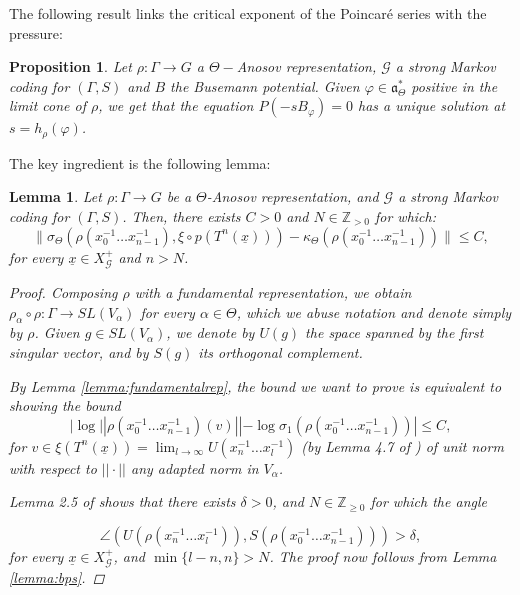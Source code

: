 \documentclass{amsart}
\newtheorem{lemma}[thm]{Lemma}
\newtheorem{prop}[thm]{Proposition}
\theoremstyle{remark}
\theoremstyle{definition}
\begin{document}
The following result links the critical exponent of the Poincar\'{e} series with the pressure:

\begin{prop}
   \label{prop:poincareradioespectral}
 Let $\rho : \Gamma \rightarrow G$ a $\Theta-$Anosov representation, $\mathcal{G}$ a strong Markov coding for $(\Gamma,S)$ and $B$ the Busemann potential. 
 Given $\varphi \in \mathfrak{a}_\Theta^*$ positive in the limit cone of $\rho$, we get that the equation $P(-s B_\varphi)= 0$ has a unique solution at $s = h_\rho (\varphi)$. 
\end{prop}

The key ingredient is the following lemma: 

\begin{lemma}
   \label{lemma:multiconesbusemann}
 Let $\rho: \Gamma \to G$ be a $\Theta$-Anosov representation, and $\mathcal{G}$ a strong Markov coding for $(\Gamma,S)$.
 Then, there exists $C>0$ and $N \in \mathbb{Z}_{>0}$ for which: 
   $$\|\sigma_\Theta(\rho(x_{0}^{-1}\ldots x_{n-1}^{-1}), \xi \circ p (T^n(\underline{x}))) - \kappa_\Theta(\rho(x_0^{-1}\ldots x_{n-1}^{-1}))\| \leq C,$$
 for every $\underline{x} \in X_\mathcal{G}^+$ and $n > N$. 
\begin{proof}
 Composing $\rho$ with a fundamental representation, we obtain $\rho_\alpha \circ \rho : \Gamma \rightarrow SL (V_\alpha)$ for every $\alpha \in \Theta$, which we abuse notation and denote simply by $\rho$.
 Given $g \in SL(V_\alpha)$, we denote by $U(g)$ the space spanned by the first singular vector, and by $S(g)$ its orthogonal complement.

 By Lemma \ref{lemma:fundamentalrep}, the bound we want to prove is equivalent to showing the bound 
   $$|\log ||\rho (x_0^{-1} \ldots x_{n-1}^{-1}) (v)|| - \log \sigma_1 (\rho (x_0^{-1} \ldots x_{n-1}^{-1}))| \leq C,$$
 for $v \in \xi (T^n (\underline{x})) = \lim_{l\to \infty} U(x_n^{-1}\ldots x_l^{-1})$ (by Lemma 4.7 of \cite{bochi2019anosov}) of unit norm with respect to $|| \cdot ||$ any adapted norm in $V_\alpha$.

 Lemma 2.5 of \cite{bochi2019anosov} shows that there exists $\delta >0$, and $N \in \mathbb{Z}_{\geq 0}$ for which the angle

   $$\angle \left( U(\rho (x_n^{-1}\ldots x_l^{-1})), S(\rho (x_0^{-1}\ldots x_{n-1}^{-1})) \right) > \delta,$$
 for every $\underline{x} \in X_{\mathcal{G}}^+$, and $\min \{l-n, n\} > N$.
 The proof now follows from Lemma \ref{lemma:bps}.
\end{proof}
\end{lemma}
\end{document}
